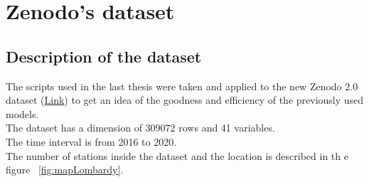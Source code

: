 
\section{Zenodo's dataset}
\subsection{Description of the dataset}
The scripts used in the last thesis were taken and applied to the new Zenodo 2.0 dataset (\href{https://zenodo.org/record/7563265#.ZAm2_y0QP5g}{Link}) to get an idea of the goodness and efficiency of the previously used models.
\\The dataset has a dimension of 309072 rows and 41 variables.
\\The time interval is from 2016 to 2020.
\\The number of stations inside the dataset and the location is described in th e figure ~\ref{fig:mapLombardy}.

